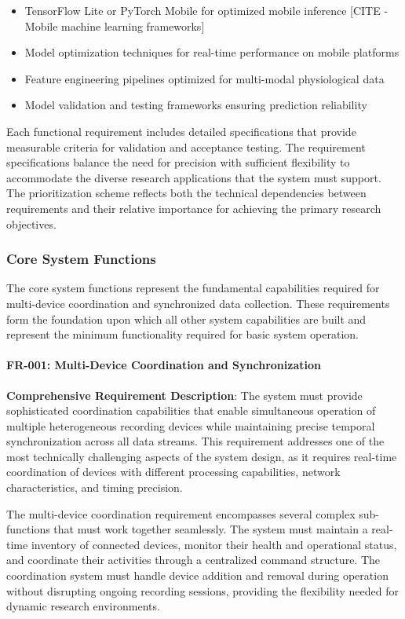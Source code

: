 \documentclass[12pt,a4paper]{report}
\begin{document}
\begin{itemize}
\item TensorFlow Lite or PyTorch Mobile for optimized mobile inference [CITE - Mobile machine learning frameworks]
\item Model optimization techniques for real-time performance on mobile platforms
\item Feature engineering pipelines optimized for multi-modal physiological data
\item Model validation and testing frameworks ensuring prediction reliability

\end{itemize}
Each functional requirement includes detailed specifications that provide measurable criteria for validation and
acceptance testing. The requirement specifications balance the need for precision with sufficient flexibility to
accommodate the diverse research applications that the system must support. The prioritization scheme reflects both the
technical dependencies between requirements and their relative importance for achieving the primary research objectives.

\subsubsection{Core System Functions}

The core system functions represent the fundamental capabilities required for multi-device coordination and synchronized
data collection. These requirements form the foundation upon which all other system capabilities are built and represent
the minimum functionality required for basic system operation.

\paragraph{FR-001: Multi-Device Coordination and Synchronization}

\textbf{Comprehensive Requirement Description}: The system must provide sophisticated coordination capabilities that enable
simultaneous operation of multiple heterogeneous recording devices while maintaining precise temporal synchronization
across all data streams. This requirement addresses one of the most technically challenging aspects of the system
design, as it requires real-time coordination of devices with different processing capabilities, network
characteristics, and timing precision.

The multi-device coordination requirement encompasses several complex sub-functions that must work together seamlessly.
The system must maintain a real-time inventory of connected devices, monitor their health and operational status, and
coordinate their activities through a centralized command structure. The coordination system must handle device addition
and removal during operation without disrupting ongoing recording sessions, providing the flexibility needed for dynamic
research environments.
\end{document}
